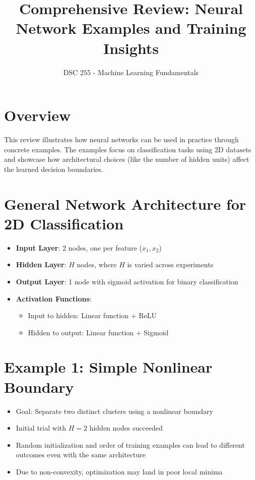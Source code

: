 \documentclass[11pt]{article}
\title{Comprehensive Review: Neural Network Examples and Training Insights}
\author{DSC 255 - Machine Learning Fundamentals}
\date{}
\begin{document}
\maketitle
\tableofcontents
\newpage

\section{Overview}

This review illustrates how neural networks can be used in practice through concrete examples. The examples focus on classification tasks using 2D datasets and showcase how architectural choices (like the number of hidden units) affect the learned decision boundaries.

\section{General Network Architecture for 2D Classification}

\begin{itemize}
    \item \textbf{Input Layer}: 2 nodes, one per feature ($x_1, x_2$)
    \item \textbf{Hidden Layer}: $H$ nodes, where $H$ is varied across experiments
    \item \textbf{Output Layer}: 1 node with sigmoid activation for binary classification
    \item \textbf{Activation Functions}:
    \begin{itemize}
        \item Input to hidden: Linear function + ReLU
        \item Hidden to output: Linear function + Sigmoid
    \end{itemize}
\end{itemize}

\section{Example 1: Simple Nonlinear Boundary}

\begin{itemize}
    \item Goal: Separate two distinct clusters using a nonlinear boundary
    \item Initial trial with $H = 2$ hidden nodes succeeded
    \item Random initialization and order of training examples can lead to different outcomes even with the same architecture
    \item Due to non-convexity, optimization may land in poor local minima
\end{itemize}
\end{document}
